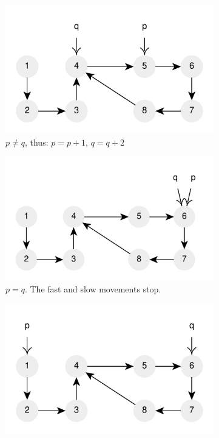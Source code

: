 \begin{figure}
\begin{subfigure}[l]{0.36\textwidth}
		\includegraphics[width=1\linewidth]{sources/cycle_in_list/images/floyd5}
		\caption{$p \neq q$,  thus: $p=p+1$, $q=q+2$}
		\label{fig:cycle_in_list:floyd5}
	 \end{subfigure}
	 \hfill
	 \begin{subfigure}[l]{0.36\textwidth}
		\includegraphics[width=1\linewidth]{sources/cycle_in_list/images/floyd6}
		\caption{$p = q$. The fast and slow movements stop.}
		\label{fig:cycle_in_list:floyd6}
	 \end{subfigure}
	 \hfill
	 \begin{subfigure}[l]{0.36\textwidth}
		\includegraphics[width=1\linewidth]{sources/cycle_in_list/images/floyd7}

\end{subfigure}
\end{figure}
